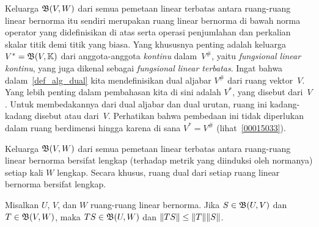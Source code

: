 \begin{exam}\label{C023228} Keluarga $\mathfrak{B}(V,W)$ dari semua pemetaan linear terbatas
antara ruang-ruang linear bernorma itu sendiri merupakan ruang linear bernorma di bawah
norma operator yang didefinisikan di atas serta operasi penjumlahan dan perkalian skalar
titik demi titik yang biasa. Yang khususnya penting adalah keluarga
$V^* = \mathfrak{B}(V,\mathbb{K})$ dari anggota-anggota \emph{kontinu} dalam~$V^{\#}$, yaitu
\emph{fungsional linear kontinu}, yang juga dikenal sebagai
\emph{fungsional linear terbatas}.
Ingat bahwa dalam~\ref{def_alg_dual} kita mendefinisikan dual aljabar $V^{\#}$ dari ruang
vektor~$V$. Yang lebih penting dalam pembahasan kita di sini adalah $V^*$, yang disebut
 dari~$V$. Untuk membedakannya dari dual aljabar dan dual urutan, ruang ini
kadang-kadang disebut
 atau
 dari~$V$. Perhatikan bahwa pembedaan ini tidak diperlukan dalam ruang
berdimensi hingga karena di sana $V^* = V^{\#}$ (lihat~\ref{00015033}).
\end{exam}

\begin{prop}\label{C023228a} Keluarga $\mathfrak{B}(V,W)$ dari semua pemetaan linear terbatas
antara ruang-ruang linear bernorma bersifat lengkap (terhadap metrik yang diinduksi oleh
normanya) setiap kali $W$ lengkap. Secara khusus, ruang dual dari setiap ruang linear
bernorma bersifat lengkap.
\end{prop}
















\begin{prop}\label{0003073} Misalkan $U$, $V$, dan $W$ ruang-ruang linear bernorma. Jika
$S \in \mathfrak{B}(U,V)$ dan $T \in \mathfrak{B}(V,W)$, maka $TS \in \mathfrak{B}(U,W)$ dan
$\lVert TS\rVert \le \lVert T\rVert \lVert S\rVert$.
\end{prop}

